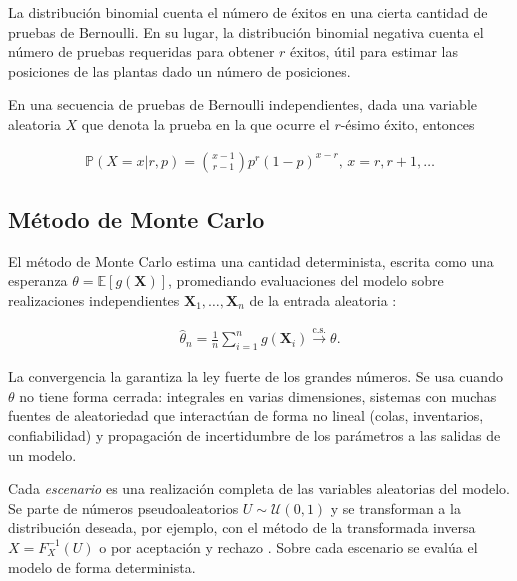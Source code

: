 La distribución binomial cuenta el número de éxitos en una cierta cantidad de pruebas de Bernoulli. En su lugar, la distribución binomial negativa cuenta el número de pruebas requeridas para obtener $r$ éxitos, útil para estimar las posiciones de las plantas dado un número de posiciones.


\begin{definition}
    En una secuencia de pruebas de Bernoulli independientes, dada una variable aleatoria $X$ que denota la prueba en la que ocurre el $r$-ésimo éxito, entonces

    \begin{align}
        \mathbb{P}(X=x|r,p)=\binom{x-1}{r-1}p^r(1-p)^{x-r},\,x=r,r+1,\dots
    \end{align}\autocite{:berger2002}
\end{definition}

\subsection{Método de Monte Carlo}

El método de Monte Carlo estima una cantidad determinista, escrita como una esperanza $\theta=\mathbb{E}[g(\mathbf{X})]$, promediando evaluaciones del modelo sobre realizaciones independientes $\mathbf{X}_1,\dots,\mathbf{X}_n$ de la entrada aleatoria \autocite{:robert2004}:

\begin{align}
    \hat{\theta}_n=\frac{1}{n}\sum_{i=1}^{n}g(\mathbf{X}_i)\xrightarrow{\text{c.s.}}\theta.
\end{align}

La convergencia la garantiza la ley fuerte de los grandes números. Se usa cuando $\theta$ no tiene forma cerrada: integrales en varias dimensiones, sistemas con muchas fuentes de aleatoriedad que interactúan de forma no lineal (colas, inventarios, confiabilidad) y propagación de incertidumbre de los parámetros a las salidas de un modelo.

Cada \emph{escenario} es una realización completa de las variables aleatorias del modelo. Se parte de números pseudoaleatorios $U\sim\mathcal{U}(0,1)$ y se transforman a la distribución deseada, por ejemplo, con el método de la transformada inversa $X=F_X^{-1}(U)$ o por aceptación y rechazo \autocite{:ross2013}. Sobre cada escenario se evalúa el modelo de forma determinista.

